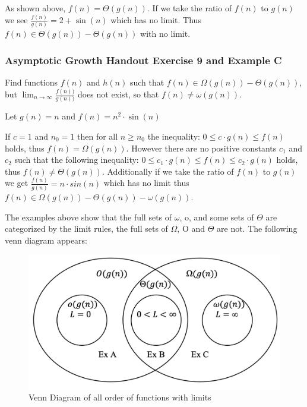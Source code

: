 \documentclass{article}
\begin{document}
As shown above, $f(n) = \Theta(g(n))$. If we take the ratio of $f(n)$ to $g(n)$ we see $\frac{f(n)}{g(n)} = 2 + \sin(n)$ which has no limit. Thus $f(n) \in \Theta(g(n)) - \Theta(g(n))$ with no limit.



\subsubsection{Asymptotic Growth Handout Exercise 9 and Example C}

Find functions $f(n)$ and $h(n)$ such that $f(n) \in \Omega(g(n)) - \Theta(g(n))$, but $\lim_{n \rightarrow \infty} \frac{f(n))}{g(n))}$ does not exist, so that $f(n) \neq \omega(g(n))$. 

Let $g(n) = n$ and $f(n) = n^2 \cdot \sin(n)$

If $c = 1$ and $n_0 = 1$ then for all $n \geq n_0$ the inequality: $0 \leq c \cdot g(n) \leq f(n)$ holds, thus $f(n) = \Omega(g(n))$. However there are no positive constants $c_1$ and $c_2$ such that the following inequality: $0 \leq c_1 \cdot g(n) \leq f(n) \leq c_2 \cdot g(n)$ holds, thus $f(n) \neq \Theta(g(n))$. Additionally if we take the ratio of $f(n)$ to $g(n)$ we get $\frac{f(n)}{g(n)} = n \cdot sin(n)$ which has no limit thus $f(n) \in \Omega(g(n)) - \Theta(g(n)) - \omega(g(n))$. 

The examples above show that the full sets of $\omega$, o, and some sets of $\Theta$ are categorized by the limit rules, the full sets of $\Omega$, O and $\Theta$ are not. The following venn diagram appears:

\begin{figure}[H]
    \centering
    \includegraphics[scale=.4]{Figures/cse102lecture3figure1.png}
    \caption{Venn Diagram of all order of functions with limits}
    \label{lecture3figure1}
\end{figure}
\end{document}
